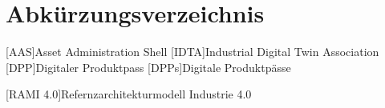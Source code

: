 \section*{Abkürzungsverzeichnis}
\begin{singlespacing}
\end{singlespacing}
\begin{acronym}

[AAS]{Asset Administration Shell}
[IDTA]{Industrial Digital Twin Association}
[DPP]{Digitaler Produktpass}
[DPPs]{Digitale Produktpässe}

[RAMI 4.0]{Refernzarchitekturmodell Industrie 4.0}

\end{acronym}



\newpage